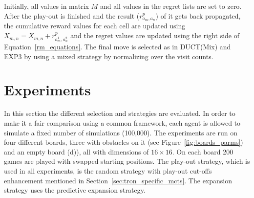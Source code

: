 \documentclass{article}
\begin{document}

Initially, all values in matrix $M$ and all values in the regret lists are set to zero. After the play-out is finished and the result ($r^{p}_{a_{m},a_{n}}$) of it gets back propagated, the cumulative reward values for each cell are updated using $X_{m,n} = X_{m,n} + r^{p}_{a^{1}_{m},a^{2}_{n}}$ and the regret values are updated using the right side of Equation~\ref{rm_equations}.
The final move is selected as in DUCT(Mix) and EXP3 by using a mixed strategy by normalizing over the visit counts. 




\section{Experiments}
\label{sec:experiments}

In this section the different selection and strategies are evaluated. 
In order to make it a fair comparison using a common framework, each agent is allowed to simulate a fixed number of simulations (100,000). 
The experiments are run on four different boards, three with obstacles on it (see Figure~\ref{fig:boards_parms}) and an empty board (d)), all with dimensions of $16 \times 16$. 
On each board 200 games are played with swapped starting positions. 
The play-out strategy, which is used in all experiments, is the random strategy with play-out cut-offs enhancement mentioned in Section~\ref{sec:tron_specific_mcts}. The expansion strategy uses the predictive expansion strategy.
\end{document}
